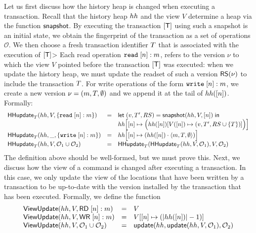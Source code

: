 \documentclass[a4paper,UKenglish]{article}%
\theoremstyle{plain}
\begin{document}
Let us first discuss how the history heap is changed when executing a transaction. 
Recall that the history heap $hh$ and the view $V$ determine a heap 
via the function $\mathsf{snapshot}$. By executing the transaction $[\mathsf{T}]$ using 
such a snapshot is an initial state, we obtain the fingerprint of the transaction 
as a set of operations $\mathcal{O}$. We then choose a fresh transaction identifier 
$T$ that is associated with the execution of $[\mathsf{T}]$> 
Each read operation ${{\tt read}}\;[n]:m$, 
refers to the version $\nu$ to which the view $V$ pointed before the transaction $[\mathsf{T}]$ 
was executed: when we update the history heap, we must update the readset of 
such a version $\mathsf{RS}(\nu)$ to include the transaction $T$. For write 
operations of the form ${{\tt write}}\;[n]:m$, we create a new version 
$\nu = (m, T, \emptyset)$ and we append it at the tail of $hh([n])$.
Formally: 
\[
\begin{array}{lll}
\mathsf{HHupdate}_{T}(hh, V, \{{{\tt read}}\;[n]: m\}) &=& 
\mathsf{let}\; (v, T', RS) = \mathsf{snapshot}(hh,V, [n]) \; \mathsf{in} \; \\
&&
hh\Big[ [n] \mapsto  \Big( hh([n])  [ V([n]) \mapsto (v, T', RS \cup \{ T \} ) ] \Big) \Big]
\\
\mathsf{HHupdate}_{T}(hh, \_, \{{{\tt write}}\; [n]: m\}) &=& 
hh\Big[ [n] \mapsto ( hh([n]) \cdot \langle m, T, \emptyset \rangle) \Big]\\
\mathsf{HHupdate}_{T}(hh, V, \mathcal{O}_1 \cup \mathcal{O}_2) &=& 
\mathsf{HHupdate}_{T}(\mathsf{HHupdate}_{T}(hh, V, \mathcal{O}_1), V, \mathcal{O}_2)
\end{array}
\]
\ac{The definition above should be well-formed, but we must prove this.}
Next, we discuss how the view of a command is changed after executing 
a transaction. In this case, we only update the view of the locations that 
have been written by a transaction to be up-to-date with the version 
installed by the transaction that has been executed. 
Formally, we define the function 
\[
\begin{array}{lll}
\mathsf{ViewUpdate}(hh, V, \mathsf{RD}\;[n]: m) &=& V\\
\mathsf{ViewUpdate}(hh, V, \mathsf{WR}\;[n]: m) &=& V[ [n] \mapsto ( \lvert hh([n]) \rvert -1)]\\
\mathsf{ViewUpdate}(hh, V, \mathcal{O}_1 \cup \mathcal{O}_2) &=& \mathsf{update}(hh, \mathsf{update}(hh, V, \mathcal{O}_1), \mathcal{O}_2)
\end{array}
\]
\end{document}
